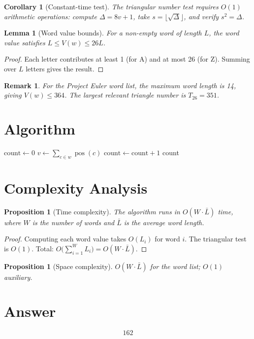 \documentclass[12pt]{article}
\newtheorem{lemma}[theorem]{Lemma}
\newtheorem{corollary}[theorem]{Corollary}
\newtheorem{proposition}[theorem]{Proposition}
\newtheorem*{remark}{Remark}
\begin{document}
\begin{corollary}[Constant-time test]
The triangular number test requires $O(1)$ arithmetic operations: compute $\Delta = 8v+1$, take $s = \lfloor \sqrt{\Delta} \rfloor$, and verify $s^2 = \Delta$.
\end{corollary}

\begin{lemma}[Word value bounds]
For a non-empty word of length $L$, the word value satisfies $L \leq V(w) \leq 26L$.
\end{lemma}

\begin{proof}
Each letter contributes at least 1 (for A) and at most 26 (for Z). Summing over $L$ letters gives the result.
\end{proof}

\begin{remark}
For the Project Euler word list, the maximum word length is 14, giving $V(w) \leq 364$. The largest relevant triangle number is $T_{26} = 351$.
\end{remark}

\section{Algorithm}

\begin{algorithm}[H]
\caption{Count Triangle Words}
\begin{algorithmic}[1]
\State $\text{count} \gets 0$
    \State $v \gets \sum_{c \in w} \operatorname{pos}(c)$
        \State $\text{count} \gets \text{count} + 1$
    \EndIf
\EndFor
\State \Return count
\end{algorithmic}
\end{algorithm}

\section{Complexity Analysis}

\begin{proposition}[Time complexity]
The algorithm runs in $O(W \cdot \bar{L})$ time, where $W$ is the number of words and $\bar{L}$ is the average word length.
\end{proposition}

\begin{proof}
Computing each word value takes $O(L_i)$ for word $i$. The triangular test is $O(1)$. Total: $O\bigl(\sum_{i=1}^W L_i\bigr) = O(W \cdot \bar{L})$.
\end{proof}

\begin{proposition}[Space complexity]
$O(W \cdot \bar{L})$ for the word list; $O(1)$ auxiliary.
\end{proposition}

\section{Answer}

\[
\boxed{162}
\]
\end{document}
